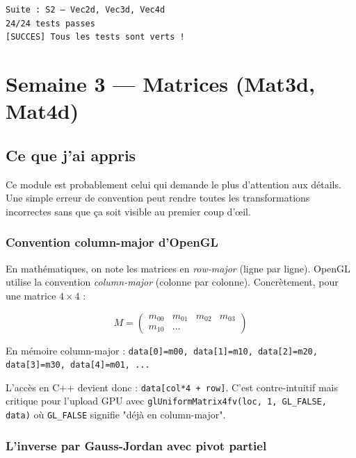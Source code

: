 \documentclass[12pt,a4paper]{report}
\newcommand{\code}[1]{\texttt{\textcolor{myblue}{#1}}}
\begin{document}
\begin{resultbox}
\texttt{Suite : S2 — Vec2d, Vec3d, Vec4d} \\
\texttt{24/24 tests passes} \\
\texttt{[SUCCES] Tous les tests sont verts !}
\end{resultbox}

\chapter{Semaine 3 — Matrices (Mat3d, Mat4d)}

\section{Ce que j'ai appris}

Ce module est probablement celui qui demande le plus d'attention aux détails. Une simple erreur de convention peut rendre toutes les transformations incorrectes sans que ça soit visible au premier coup d'œil.

\subsection{Convention column-major d'OpenGL}

En mathématiques, on note les matrices en \textit{row-major} (ligne par ligne). OpenGL utilise la convention \textit{column-major} (colonne par colonne). Concrètement, pour une matrice $4\times4$ :

$$
M = \begin{pmatrix} m_{00} & m_{01} & m_{02} & m_{03} \\ m_{10} & \ldots \end{pmatrix}
$$

En mémoire column-major : \code{data[0]=m00, data[1]=m10, data[2]=m20, data[3]=m30, data[4]=m01, ...}

L'accès en C++ devient donc : \code{data[col*4 + row]}. C'est contre-intuitif mais critique pour l'upload GPU avec \code{glUniformMatrix4fv(loc, 1, GL\_FALSE, data)} où \code{GL\_FALSE} signifie "déjà en column-major".

\subsection{L'inverse par Gauss-Jordan avec pivot partiel}
\end{document}
